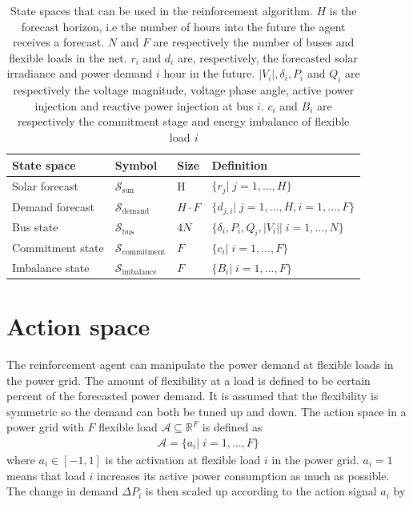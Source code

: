 \documentclass[class=book, crop=false, 11pt]{standalone}
\begin{document}
\begin{table}[ht]
\centering
\caption{State spaces that can be used in the reinforcement algorithm. $H$ is the forecast horizon, i.e the number of hours into the future the agent receives a forecast. $N$ and $F$ are respectively the number of buses and flexible loads in the net. $r_{i}$ and $d_{i}$ are, respectively, the forecasted solar irradiance and power demand $i$ hour in the future. $|V_{i}|,\delta_{i}, P_{i}$ and $Q_{i}$ are respectively the voltage magnitude, voltage phase angle, active power injection and reactive power injection at bus $i$. $c_{i}$ and $B_{i}$ are respectively the commitment stage and energy imbalance of flexible load \textit{i}}
\label{table:state_spaces}
\begin{tabular}{l|lll}

State space  & Symbol & Size & Definition
\\ 
\hline
Solar forecast      & $\mathcal{S}_{\textrm{sun}}$& H  &  $\{r_{j} |\;j=1,...,H\}$
\\ 

Demand forecast    & $\mathcal{S}_{\textrm{demand}}$ &$H\cdot F$ &$\{d_{j,i} |\;j=1,...,H,i=1,...,F\}$  \\ 
Bus state & $\mathcal{S}_{\textrm{bus}}$ & $4N$ &$\{\delta_{i}, P_{i}, Q_{i}, |V_{i}| |\; i = 1,...,N\}$\\

Commitment state &$\mathcal{S}_{\textrm{commitment}}$& $F$  &$\{ c_{i} |\; i = 1,...,F\}$ \\
 
Imbalance state &$\mathcal{S}_{\textrm{imbalance}}$& $F$  &$\{ B_{i} |\; i = 1,...,F\}$ \\

\hline
\end{tabular}
\end{table}
\section{Action space}
The reinforcement agent can manipulate the power demand at flexible loads in the power grid. The amount of flexibility at a load is defined to be certain percent of the forecasted power demand. It is assumed that the flexibility is symmetric so the demand can both be tuned up and down. The action space in a power grid with $F$ flexible load  $\mathcal{A}  \subseteq \mathbb{R}^{F}$ is defined as
\begin{equation}
   \begin{aligned}
   \label{eq:problem:action_space}
\mathcal{A}= \{a_{i} | \;i = 1,...,F\}
    \end{aligned} 
\end{equation}
where $a_{i} \in [-1,1]$ is the activation at flexible load $i$ in the power grid. $a_{i} = 1$ means that load $i$ increases its active power consumption as much as possible. The change in demand $\Delta P_{i}$ is then scaled up according to the action signal $a_{i}$ by
\end{document}
